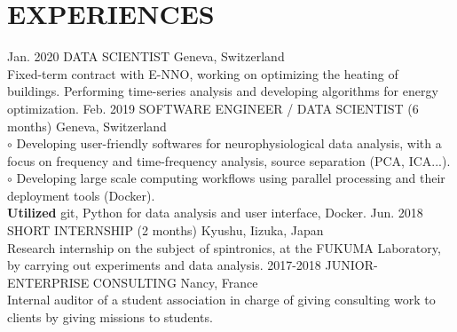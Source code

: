 \documentclass[]{cv-style}
\begin{document}
\section{EXPERIENCES}
\begin{entrylist}
%
\entry
{Jan. 2020}
{DATA SCIENTIST}
{Geneva, Switzerland}
{\\
    Fixed-term contract with E-NNO, working on optimizing the heating of buildings. Performing time-series analysis and developing algorithms for energy optimization.
\vspace{0.1cm}
}
%
\entry
{Feb. 2019}
{SOFTWARE ENGINEER / DATA SCIENTIST (6 months)}
{Geneva, Switzerland}
{\\
    $\circ$ Developing user-friendly softwares for neurophysiological data
    analysis, with a focus on frequency and time-frequency analysis, source
    separation (PCA, ICA...).\\
    $\circ$ Developing large scale computing workflows using parallel 
    processing and their deployment tools (Docker).\\
\textbf{Utilized} git, Python for data analysis and user interface, Docker.
\vspace{0.1cm}
}
\entry
{Jun. 2018}
{SHORT INTERNSHIP (2 months)}
{Kyushu, Iizuka, Japan}
{\\
    Research internship on the subject of spintronics, at the FUKUMA
    Laboratory, by carrying out experiments and data analysis.
\vspace{0.1cm}
}
\entry
{2017-2018}
{JUNIOR-ENTERPRISE CONSULTING}
{Nancy, France}
{\\
    Internal auditor of a student association in charge of giving consulting
    work to clients by giving missions to students.\\
\vspace{0.1cm}
}
%
\end{entrylist}
\hphantom\\
%
\end{document}
